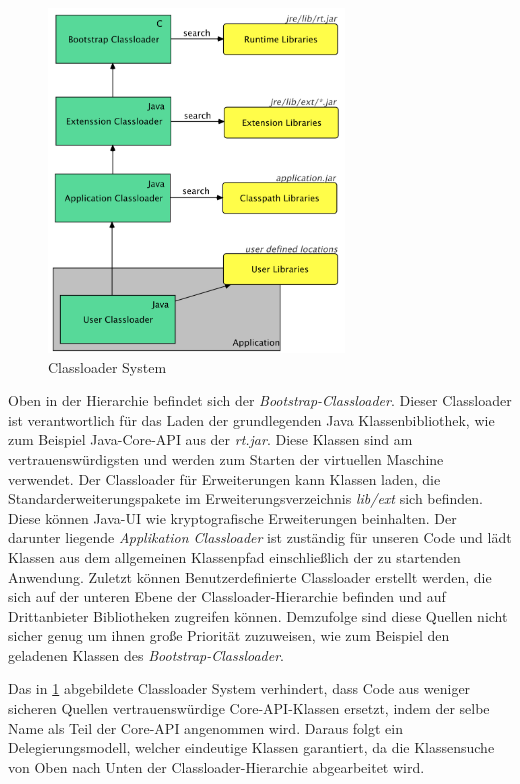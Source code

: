     \begin{figure}[h!]
      \centering
      \includegraphics[width=0.7\textwidth]{material/images/Classloader.png}
      \caption{Classloader System}
      \label{fig:cl}
    \end{figure}
    
    Oben in der Hierarchie befindet sich der \textit{Bootstrap-Classloader}. Dieser Classloader ist verantwortlich für das Laden der grundlegenden Java Klassenbibliothek, wie zum Beispiel Java-Core-API aus der \textit{rt.jar}. Diese Klassen sind am vertrauenswürdigsten und werden zum Starten der virtuellen Maschine verwendet. Der Classloader für Erweiterungen kann Klassen laden, die Standarderweiterungspakete im Erweiterungsverzeichnis \textit{lib/ext} sich befinden. Diese können Java-UI wie kryptografische Erweiterungen beinhalten. Der darunter liegende \textit{Applikation Classloader} ist zuständig für unseren Code und lädt Klassen aus dem allgemeinen Klassenpfad einschließlich der zu startenden Anwendung. Zuletzt können Benutzerdefinierte Classloader erstellt werden, die sich auf der unteren Ebene der Classloader-Hierarchie befinden und auf Drittanbieter Bibliotheken zugreifen können. Demzufolge sind diese Quellen nicht sicher genug um ihnen große Priorität zuzuweisen, wie zum Beispiel den geladenen Klassen des \textit{Bootstrap-Classloader}. \bigbreak 

    Das in \ref{fig:cl} abgebildete Classloader System verhindert, dass Code aus weniger sicheren Quellen vertrauenswürdige Core-API-Klassen ersetzt, indem der selbe Name als Teil der Core-API angenommen wird. Daraus folgt ein Delegierungsmodell, welcher eindeutige Klassen garantiert, da die Klassensuche von Oben nach Unten der Classloader-Hierarchie abgearbeitet wird. 
    

